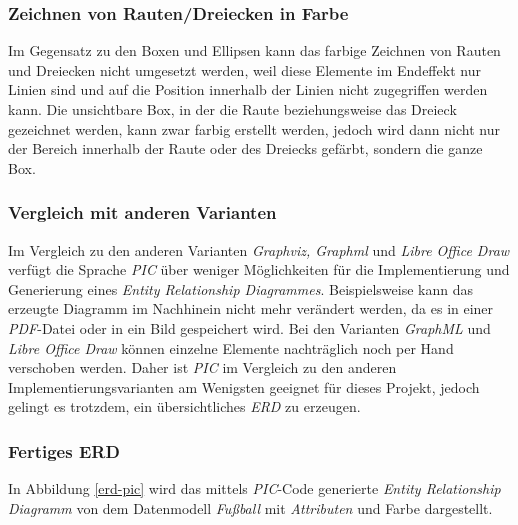\subsubsection{Zeichnen von Rauten/Dreiecken in Farbe}
\noindent
Im Gegensatz zu den Boxen und Ellipsen kann das farbige Zeichnen von Rauten und Dreiecken nicht umgesetzt werden, weil diese Elemente im Endeffekt nur Linien sind und auf die Position innerhalb der Linien nicht zugegriffen werden kann. Die unsichtbare Box, in der die Raute beziehungsweise das Dreieck gezeichnet werden, kann zwar farbig erstellt werden, jedoch wird dann nicht nur der Bereich innerhalb der Raute oder des Dreiecks gefärbt, sondern die ganze Box.

\subsubsection{Vergleich mit anderen Varianten}
\pra
\noindent
Im Vergleich zu den anderen Varianten \textit{Graphviz, Graphml} und \textit{Libre Office Draw} verfügt die Sprache \textit{PIC} über weniger Möglichkeiten für die Implementierung und Generierung eines \textit{Entity Relationship Diagrammes}. Beispielsweise kann das erzeugte Diagramm im Nachhinein nicht mehr verändert werden, da es in einer \textit{PDF}-Datei oder in ein Bild gespeichert wird. Bei den Varianten \textit{GraphML} und \textit{Libre Office Draw} können einzelne Elemente nachträglich noch per Hand verschoben werden. Daher ist \textit{PIC} im Vergleich zu den anderen Implementierungsvarianten am Wenigsten geeignet für dieses Projekt, jedoch gelingt es trotzdem, ein übersichtliches \textit{ERD} zu erzeugen.
\\

\subsubsection{Fertiges ERD}

\noindent
In Abbildung \ref{erd-pic} wird das mittels \textit{PIC}-Code generierte \textit{Entity Relationship Diagramm} von dem Datenmodell \textit{Fußball}  mit \textit{Attributen} und Farbe dargestellt.
\\

